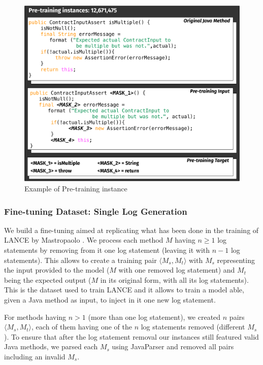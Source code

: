\begin{figure}[h!]
	\label{fig:pre-training}
	\includegraphics[width=\columnwidth]{img/pre-training.pdf}
		\caption{Example of Pre-training instance}
\end{figure}

\subsubsection{Fine-tuning Dataset: Single Log Generation} \label{sec:single-log-dataset}
We build a fine-tuning aimed at replicating what has been done in the training of LANCE by Mastropaolo \etal \cite{mastropaolo2022using}. We process each method $M$ having $n \geq 1$ log statements by removing from it one log statement (\ie leaving it with $n-1$ log statements). This allows to create a training pair $\langle M_s, M_t \rangle$ with $M_s$ representing the input provided to the model (\ie $M$ with one removed log statement) and  $M_t$ being the expected output (\ie $M$ in its original form, with all its log statements). This is the dataset used to train LANCE \cite{mastropaolo2022using} and it allows to train a model able, given a Java method as input, to inject in it one new log statement. 

For methods having $n > 1$ (\ie more than one log statement), we created $n$ pairs $\langle M_s, M_t \rangle$, each of them having one of the $n$ log statements removed (\ie different $M_s$). To ensure that after the log statement removal our instances still featured valid Java methods, we parsed each $M_s$ using JavaParser \cite{javaparser} and removed all pairs including an invalid $M_s$. 

